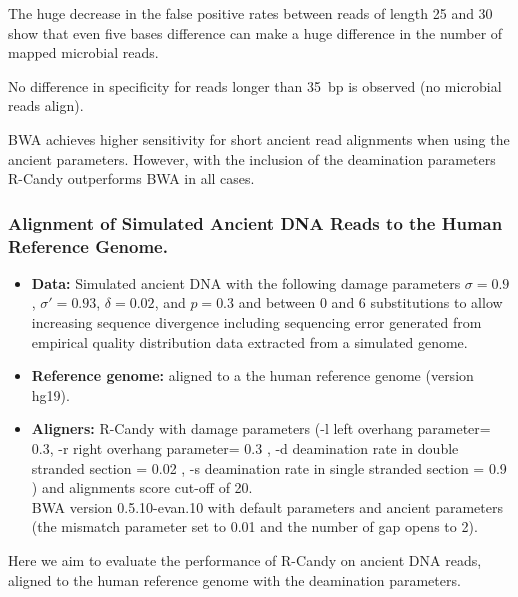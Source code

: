 \documentclass[11pt,a4paper]{report}
\begin{document}
The huge decrease in the false positive rates between reads of length 
25 and 30 show that even five bases difference can make a huge 
difference in the number of mapped microbial reads.


No difference in specificity for reads longer than 35~bp is observed
(no microbial reads align).


BWA achieves higher sensitivity for short 
ancient read alignments when using the ancient parameters. 
However, with the inclusion of the deamination parameters R-Candy 
outperforms BWA in all cases.



\subsubsection{Alignment of Simulated Ancient DNA Reads to the Human Reference Genome.}
\label{Alignment of Simulated Ancient DNA Reads to the Human Reference Genome.}
 
 \begin{itemize}
 
    \item \textbf{Data:} Simulated ancient DNA 
     with the following damage parameters $ \sigma = 0.9$, 
    $ \sigma' = 0.93 $, $\delta = 0.02 $,  and $p = 0.3 $ and 
    between 0 and 6 substitutions to allow increasing sequence divergence
    including sequencing error generated from empirical quality distribution data
    extracted from a simulated genome.
  
   \item \textbf{Reference genome:} aligned to a the human reference genome (version hg19).

 
    \item \textbf{Aligners:} 
R-Candy with damage parameters 
(-l left overhang parameter= 0.3, -r right overhang parameter= 0.3 , 
-d deamination rate in double stranded section = 0.02 , 
-s deamination rate in single stranded section = 0.9 )
 and alignments score cut-off of 20. \\
BWA version 0.5.10-evan.10 with default parameters and ancient parameters 
(the mismatch parameter set to 0.01 
and the number of gap opens to 2)\cite{green2010draft}.
 
  \end{itemize}
 

Here we aim to evaluate the performance of R-Candy on ancient DNA reads, 
aligned to the human reference genome with the deamination parameters.
\end{document}
